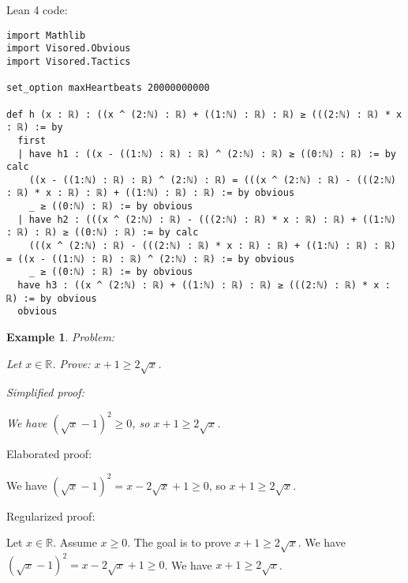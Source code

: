 \documentclass{article}
\newtheorem{example}{Example}
\begin{document}
Lean 4 code:
\begin{tcolorbox}[colback=white!10, width=\linewidth]
\begin{lstlisting}[language=Lean4]
import Mathlib
import Visored.Obvious
import Visored.Tactics

set_option maxHeartbeats 20000000000

def h (x : ℝ) : ((x ^ (2:ℕ) : ℝ) + ((1:ℕ) : ℝ) : ℝ) ≥ (((2:ℕ) : ℝ) * x : ℝ) := by
  first
  | have h1 : ((x - ((1:ℕ) : ℝ) : ℝ) ^ (2:ℕ) : ℝ) ≥ ((0:ℕ) : ℝ) := by calc
    ((x - ((1:ℕ) : ℝ) : ℝ) ^ (2:ℕ) : ℝ) = (((x ^ (2:ℕ) : ℝ) - (((2:ℕ) : ℝ) * x : ℝ) : ℝ) + ((1:ℕ) : ℝ) : ℝ) := by obvious
    _ ≥ ((0:ℕ) : ℝ) := by obvious
  | have h2 : (((x ^ (2:ℕ) : ℝ) - (((2:ℕ) : ℝ) * x : ℝ) : ℝ) + ((1:ℕ) : ℝ) : ℝ) ≥ ((0:ℕ) : ℝ) := by calc
    (((x ^ (2:ℕ) : ℝ) - (((2:ℕ) : ℝ) * x : ℝ) : ℝ) + ((1:ℕ) : ℝ) : ℝ) = ((x - ((1:ℕ) : ℝ) : ℝ) ^ (2:ℕ) : ℝ) := by obvious
    _ ≥ ((0:ℕ) : ℝ) := by obvious
  have h3 : ((x ^ (2:ℕ) : ℝ) + ((1:ℕ) : ℝ) : ℝ) ≥ (((2:ℕ) : ℝ) * x : ℝ) := by obvious
  obvious

\end{lstlisting}
\end{tcolorbox}


\begin{example}
Problem:
\begin{tcolorbox}[colback=yellow!10, width=\linewidth]
Let $x\in\mathbb{R}$. Prove: $x + 1 \ge 2\sqrt{x}$.
\end{tcolorbox}

Simplified proof:
\begin{tcolorbox}[colback=blue!10, width=\linewidth]
We have $(\sqrt{x}-1)^2 \ge 0$, so $x+1 \ge 2\sqrt{x}$.
\end{tcolorbox}
\end{example}

Elaborated proof:
\begin{tcolorbox}[colback=green!10, width=\linewidth]
We have $(\sqrt{x}-1)^2 = x - 2\sqrt{x} + 1 \ge 0$, so $x+1 \ge 2\sqrt{x}$.
\end{tcolorbox}

Regularized proof:
\begin{tcolorbox}[colback=red!10, width=\linewidth]
Let $x\in\mathbb{R}$.
Assume $x\ge 0$.
The goal is to prove $x+1 \ge 2\sqrt{x}$.
We have ${(\sqrt{x}-1)}^2 = x - 2\sqrt{x} + 1 \ge 0$.
We have $x+1 \ge 2\sqrt{x}$.
\end{tcolorbox}
\end{document}
